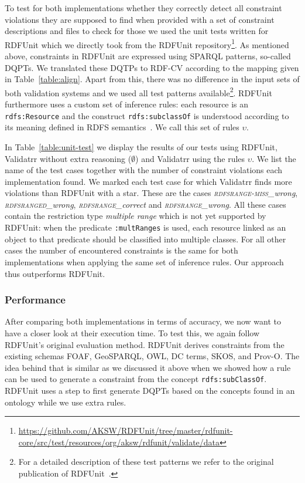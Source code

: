 \normalsize
To test for both implementations whether they correctly detect all constraint violations they are supposed to find when provided with a set of constraint descriptions and
files to check for those we used the unit tests written for RDFUnit which we directly
took from the RDFUnit repository\footnote{\url{https://github.com/AKSW/RDFUnit/tree/master/rdfunit-core/src/test/resources/org/aksw/rdfunit/validate/data}}.
As mentioned above, constraints in RDFUnit are expressed using SPARQL patterns, so-called DQPTs. 
We translated these DQTPs to RDF-CV according to the mapping given in Table~\ref{table:align}.
Apart from this, there was no difference in the input sets of both validation systems and 
we used all test patterns available\footnote{For a detailed description of these test patterns we refer to
the original publication of RDFUnit~\cite{kontokostas2014test}.}.
RDFUnit furthermore uses a custom set of inference rules: each resource is an \texttt{rdfs:Resource} and the construct \texttt{rdfs:subclassOf} is understood according to its meaning defined in 
RDFS semantics~\cite{RDFSemantics}. We call this set of rules $\upsilon$. 

In Table~\ref{table:unit-test} we display the results of our tests using RDFUnit, Validatrr without extra reasoning  ($\emptyset$) and Validatrr using the rules $\upsilon$.
We list the name of the test cases together with the number of constraint violations each implementation found. 
We marked each test case for which Validatrr finds more violations than RDFUnit with a star. These are the cases 
\textit{{\scshape rdfsrange-miss}\_wrong}, \textit{{\scshape rdfsranged}\_wrong}, \textit{{\scshape rdfsrange}\_correct} and \textit{{\scshape rdfsrange}\_wrong}.
All these cases contain the restriction type \emph{multiple range} which is not yet supported by RDFUnit: when the predicate \texttt{:multRanges} is used, 
each resource linked as an object to that predicate should be classified into multiple classes. For all other cases the number of encountered constraints is the same for both
implementations when applying the same set of inference rules. Our approach thus outperforms RDFUnit.




\subsubsection{Performance}
After comparing both implementations in terms of accuracy, we now want to have a closer look at their execution time. To test this, we again follow 
RDFUnit's original evaluation method. RDFUnit derives constraints from the existing schemas FOAF, GeoSPARQL, OWL, DC terms, SKOS, and Prov-O. 
The idea behind that is similar as we discussed it above when we showed how a rule can be used to generate a constraint from the concept \texttt{rdfs:subClassOf}. RDFUnit uses a step 
to first generate DQPTs based on the concepts found in an ontology while we use extra rules.

